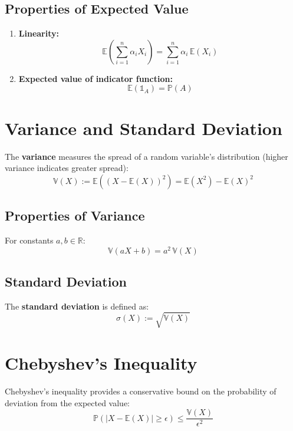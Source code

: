 \documentclass{article}
\begin{document}
\subsection{Properties of Expected Value}

\begin{enumerate}
    \item \textbf{Linearity:}
    \[
        \mathbb{E}\left(\sum_{i=1}^n \alpha_i X_i\right) = \sum_{i=1}^n \alpha_i \, \mathbb{E}(X_i)
    \]
    
    \item \textbf{Expected value of indicator function:}
    \[
        \mathbb{E}(\mathbb{1}_A) = \mathbb{P}(A)
    \]
\end{enumerate}

\section{Variance and Standard Deviation}

The \textbf{variance} measures the spread of a random variable's distribution (higher variance indicates greater spread):
\[
    \mathbb{V}(X) := \mathbb{E}\left((X - \mathbb{E}(X))^2\right) = \mathbb{E}(X^2) - \mathbb{E}(X)^2
\]

\subsection{Properties of Variance}

For constants $a, b \in \mathbb{R}$:
\[
    \mathbb{V}(aX + b) = a^2 \, \mathbb{V}(X)
\]

\subsection{Standard Deviation}

The \textbf{standard deviation} is defined as:
\[
    \sigma(X) := \sqrt{\mathbb{V}(X)}
\]

\section{Chebyshev's Inequality}

Chebyshev's inequality provides a conservative bound on the probability of deviation from the expected value:
\[
    \mathbb{P}\left(|X - \mathbb{E}(X)| \geq \epsilon\right) \leq \frac{\mathbb{V}(X)}{\epsilon^2}
\]
\end{document}
